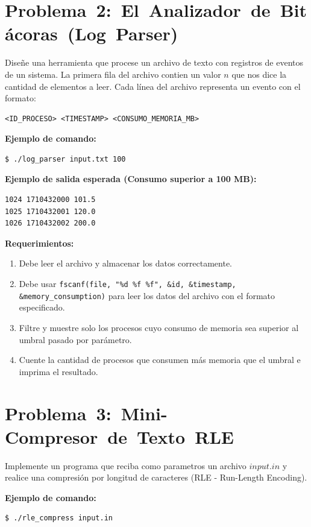 \documentclass[12pt,a4paper]{article}
\begin{document}
\newpage

\section*{\mbox{Problema 2: El Analizador de Bitácoras (Log Parser)}}
Diseñe una herramienta que procese un archivo de texto con registros de eventos de un sistema. La primera fila del archivo contien un valor $n$ que nos dice la cantidad de elementos a leer. Cada línea del archivo representa un evento con el formato:

\begin{lstlisting}[numbers=none]
<ID_PROCESO> <TIMESTAMP> <CONSUMO_MEMORIA_MB>
\end{lstlisting}

\textbf{Ejemplo de comando:} 
\begin{lstlisting}[numbers=none]
$ ./log_parser input.txt 100
\end{lstlisting}

\textbf{Ejemplo de salida esperada (Consumo superior a 100 MB):} 
\begin{lstlisting}[numbers=none]
1024 1710432000 101.5
1025 1710432001 120.0
1026 1710432002 200.0
\end{lstlisting}

\textbf{Requerimientos:}
\begin{enumerate}
    \item Debe leer el archivo y almacenar los datos correctamente.
    \item Debe usar \texttt{fscanf(file, "\%d \%f \%f", \&id, \&timestamp, \&memory\_consumption)} para leer los datos del archivo con el formato especificado.
    \item Filtre y muestre solo los procesos cuyo consumo de memoria sea superior al umbral pasado por parámetro.
    \item Cuente la cantidad de procesos que consumen más memoria que el umbral e imprima el resultado. 
\end{enumerate}

\newpage

\section*{\mbox{Problema 3: Mini-Compresor de Texto RLE}}
Implemente un programa que reciba como parametros un archivo $input.in$ y realice una compresión por longitud de caracteres (RLE - Run-Length Encoding).

\textbf{Ejemplo de comando:}
\begin{lstlisting}[numbers=none]
$ ./rle_compress input.in
\end{lstlisting}
\end{document}
